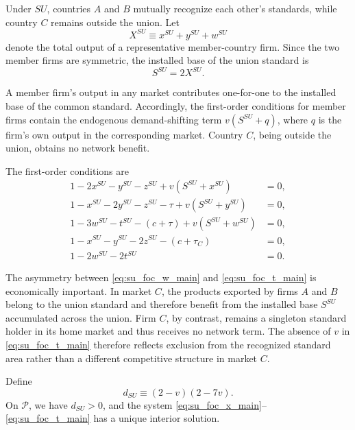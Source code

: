 Under $SU$, countries $A$ and $B$ mutually recognize each other's standards, while country $C$ remains outside the union. Let
\[
X^{SU}\equiv x^{SU}+y^{SU}+w^{SU}
\]
denote the total output of a representative member-country firm. Since the two member firms are symmetric, the installed base of the union standard is
\[
S^{SU}=2X^{SU}.
\]

A member firm's output in any market contributes one-for-one to the installed base of the common standard. Accordingly, the first-order conditions for member firms contain the endogenous demand-shifting term $v(S^{SU}+q)$, where $q$ is the firm's own output in the corresponding market. Country $C$, being outside the union, obtains no network benefit.

The first-order conditions are
\begin{align}
1-2x^{SU}-y^{SU}-z^{SU}+v(S^{SU}+x^{SU}) &=0, \label{eq:su_foc_x_main}\\
1-x^{SU}-2y^{SU}-z^{SU}-\tau+v(S^{SU}+y^{SU}) &=0, \label{eq:su_foc_y_main}\\
1-3w^{SU}-t^{SU}-(c+\tau)+v(S^{SU}+w^{SU}) &=0, \label{eq:su_foc_w_main}\\
1-x^{SU}-y^{SU}-2z^{SU}-(c+\tau_C) &=0, \label{eq:su_foc_z_main}\\
1-2w^{SU}-2t^{SU} &=0. \label{eq:su_foc_t_main}
\end{align}

The asymmetry between \eqref{eq:su_foc_w_main} and \eqref{eq:su_foc_t_main} is
economically important. In market $C$, the products exported by firms $A$ and
$B$ belong to the union standard and therefore benefit from the installed base
$S^{SU}$ accumulated across the union. Firm $C$, by contrast, remains a
singleton standard holder in its home market and thus receives no network term.
The absence of $v$ in \eqref{eq:su_foc_t_main} therefore reflects exclusion
from the recognized standard area rather than a different competitive
structure in market $C$.

Define
\[
d_{SU}\equiv (2-v)(2-7v).
\]
On $\mathcal P$, we have $d_{SU}>0$, and the system \eqref{eq:su_foc_x_main}--\eqref{eq:su_foc_t_main} has a unique interior solution.

